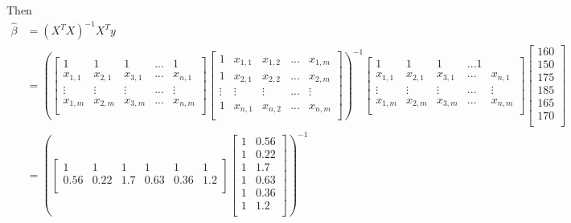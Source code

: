 \documentclass[a4paper]{article}
\begin{document}
{\begin{enumerate}
Then \begin{align*}
\hat{\beta} &= (X^TX)^{-1}X^Ty \\ &= \left(
\begin{bmatrix}
1 & 1 & 1 & ... & 1  \\
x_{1,1} & x_{2,1} & x_{3,1} & ... & x_{n,1} \\
\vdots & \vdots & \vdots & ... & \vdots \\
x_{1,m} & x_{2,m} & x_{3,m} & ... & x_{n,m} \\
\end{bmatrix}
\begin{bmatrix}
1 & x_{1,1} & x_{1,2} & ... & x_{1,m} \\
1 & x_{2,1} & x_{2,2} & ... & x_{2,m} \\
\vdots & \vdots & \vdots & ... & \vdots \\
1 & x_{n,1} & x_{n,2} & ... & x_{n,m} \\
\end{bmatrix} \right)^{-1}\begin{bmatrix}
1 & 1 & 1 & ... 1  \\
x_{1,1} & x_{2,1} & x_{3,1} & ... & x_{n,1} \\
\vdots & \vdots & \vdots & ... & \vdots \\
x_{1,m} & x_{2,m} & x_{3,m} & ... & x_{n,m} \\
\end{bmatrix}
\begin{bmatrix}
160  \\
150  \\
175  \\
185  \\
165  \\
170  \\
\end{bmatrix} \\ &= \left(
\begin{bmatrix}
1 & 1 & 1 & 1 & 1 & 1 \\
0.56 & 0.22 & 1.7 & 0.63 & 0.36 &  1.2   \\
\end{bmatrix}
\begin{bmatrix}
1 & 0.56  \\
1 & 0.22  \\
1 & 1.7  \\
1 & 0.63  \\
1 & 0.36  \\
1 & 1.2  \\
\end{bmatrix} \right)^{-1}

\end{align*}
\end{enumerate}}
\end{document}
